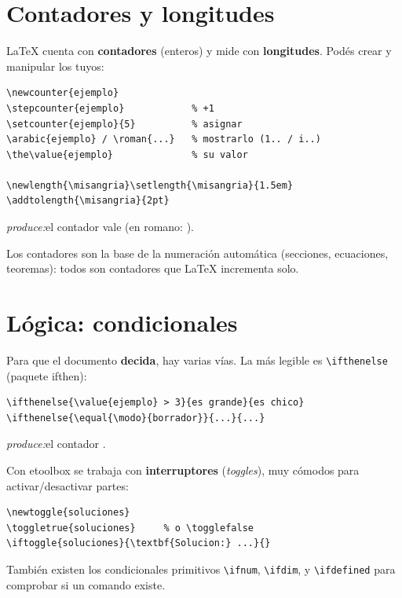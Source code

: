 \documentclass[11pt,a4paper]{article}
\newcommand{\C}[1]{\texttt{\textbackslash #1}}
\newcommand{\pkg}[1]{\textsf{#1}}
\newcommand{\produce}{\par\smallskip\noindent\textit{produce:}\quad}
\newcounter{ejemplo}                        %
\begin{document}
\section{Contadores y longitudes}
\LaTeX{} cuenta con \textbf{contadores} (enteros) y mide con \textbf{longitudes}.
Podés crear y manipular los tuyos:
\begin{lstlisting}
\newcounter{ejemplo}
\stepcounter{ejemplo}            % +1
\setcounter{ejemplo}{5}          % asignar
\arabic{ejemplo} / \roman{...}   % mostrarlo (1.. / i..)
\the\value{ejemplo}              % su valor

\newlength{\misangria}\setlength{\misangria}{1.5em}
\addtolength{\misangria}{2pt}
\end{lstlisting}
%
\produce el contador vale  (en romano: ).
\medskip

Los contadores son la base de la numeración automática (secciones, ecuaciones,
teoremas): todos son contadores que \LaTeX{} incrementa solo.

\section{Lógica: condicionales}
Para que el documento \textbf{decida}, hay varias vías. La más legible es
\C{ifthenelse} (paquete \pkg{ifthen}):
\begin{lstlisting}
\ifthenelse{\value{ejemplo} > 3}{es grande}{es chico}
\ifthenelse{\equal{\modo}{borrador}}{...}{...}
\end{lstlisting}
\produce el contador 
.
\medskip

Con \pkg{etoolbox} se trabaja con \textbf{interruptores} (\emph{toggles}), muy
cómodos para activar/desactivar partes:
\begin{lstlisting}
\newtoggle{soluciones}
\toggletrue{soluciones}     % o \togglefalse
\iftoggle{soluciones}{\textbf{Solucion:} ...}{}
\end{lstlisting}
También existen los condicionales primitivos \C{ifnum}, \C{ifdim}, y
\C{ifdefined} para comprobar si un comando existe.

\end{document}
